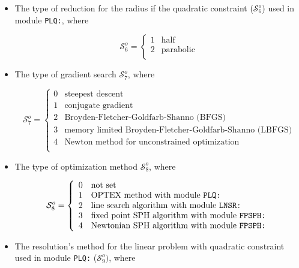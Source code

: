 \begin{itemize}
\item The type of reduction for the radius if the quadratic constraint ($\mathcal{S}^{o}_{6}$) used in module {\tt PLQ:}, where

\begin{displaymath}
\mathcal{S}^{o}_{6} = \left\{
\begin{array}{rl}
 1 & \textrm{half} \\
 2 & \textrm{parabolic} \\
\end{array} \right.
\end{displaymath}

\item The type of gradient search $\mathcal{S}^{o}_{7}$, where

\begin{displaymath}
\mathcal{S}^{o}_{7} = \left\{
\begin{array}{rl}
 0 & \textrm{steepest descent} \\
 1 & \textrm{conjugate gradient} \\
 2 & \textrm{Broyden-Fletcher-Goldfarb-Shanno (BFGS)} \\
 3 & \textrm{memory limited Broyden-Fletcher-Goldfarb-Shanno (LBFGS)} \\
 4 & \textrm{Newton method for unconstrained optimization} \\
\end{array} \right.
\end{displaymath}

\item The type of optimization method $\mathcal{S}^{o}_{8}$, where

\begin{displaymath}
\mathcal{S}^{o}_{8} = \left\{
\begin{array}{rl}
 0 & \textrm{not set} \\
 1 & \textrm{OPTEX method with module {\tt PLQ:}} \\
 2 & \textrm{line search algorithm with module {\tt LNSR:}} \\
 3 & \textrm{fixed point SPH algorithm with module {\tt FPSPH:}} \\
 4 & \textrm{Newtonian SPH algorithm with module {\tt FPSPH:}} \\
\end{array} \right.
\end{displaymath}

\item The resolution's method for the linear problem with quadratic constraint used in module {\tt PLQ:} ($\mathcal{S}^{o}_{9})$, where


\end{itemize}
